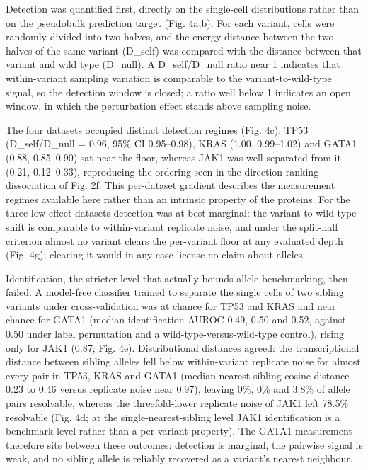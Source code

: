 \documentclass[11pt,letterpaper]{article}
\begin{document}
Detection was quantified first, directly on the single-cell distributions rather than on the pseudobulk prediction target (Fig. 4a,b). For each variant, cells were randomly divided into two halves, and the energy distance between the two halves of the same variant (D\_self) was compared with the distance between that variant and wild type (D\_null). A D\_self/D\_null ratio near 1 indicates that within-variant sampling variation is comparable to the variant-to-wild-type signal, so the detection window is closed; a ratio well below 1 indicates an open window, in which the perturbation effect stands above sampling noise.

The four datasets occupied distinct detection regimes (Fig. 4c). TP53 (D\_self/D\_null = 0.96, 95\% CI 0.95--0.98), KRAS (1.00, 0.99--1.02) and GATA1 (0.88, 0.85--0.90) sat near the floor, whereas JAK1 was well separated from it (0.21, 0.12--0.33), reproducing the ordering seen in the direction-ranking dissociation of Fig. 2f. This per-dataset gradient describes the measurement regimes available here rather than an intrinsic property of the proteins. For the three low-effect datasets detection was at best marginal: the variant-to-wild-type shift is comparable to within-variant replicate noise, and under the split-half criterion almost no variant clears the per-variant floor at any evaluated depth (Fig. 4g); clearing it would in any case license no claim about alleles.

Identification, the stricter level that actually bounds allele benchmarking, then failed. A model-free classifier trained to separate the single cells of two sibling variants under cross-validation was at chance for TP53 and KRAS and near chance for GATA1 (median identification AUROC 0.49, 0.50 and 0.52, against 0.50 under label permutation and a wild-type-versus-wild-type control), rising only for JAK1 (0.87; Fig. 4e). Distributional distances agreed: the transcriptional distance between sibling alleles fell below within-variant replicate noise for almost every pair in TP53, KRAS and GATA1 (median nearest-sibling cosine distance 0.23 to 0.46 versus replicate noise near 0.97), leaving 0\%, 0\% and 3.8\% of allele pairs resolvable, whereas the threefold-lower replicate noise of JAK1 left 78.5\% resolvable (Fig. 4d; at the single-nearest-sibling level JAK1 identification is a benchmark-level rather than a per-variant property). The GATA1 measurement therefore sits between these outcomes: detection is marginal, the pairwise signal is weak, and no sibling allele is reliably recovered as a variant's nearest neighbour.
\end{document}
